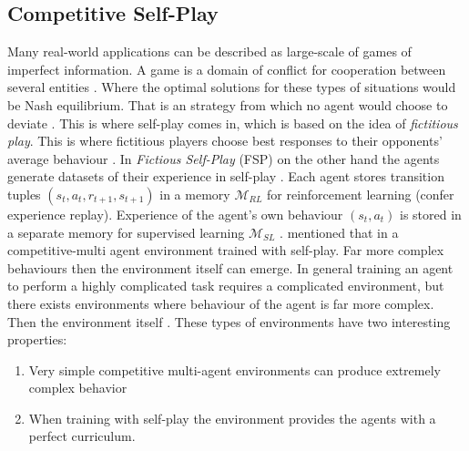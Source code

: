 \documentclass{kththesis}
\theoremstyle{definition}
\begin{document}
\subsection{Competitive Self-Play}
Many real-world applications can be described as large-scale of games of imperfect information. A game is a domain of conflict for cooperation between several entities \parencite{heinrich2016deep}. Where the optimal solutions for these types of situations would be Nash equilibrium. That is an strategy from which no agent would choose to deviate \parencite{heinrich2016deep}. This is where self-play comes in, which is based on the idea of \textit{fictitious play}. This is where fictitious players choose best responses to their opponents' average behaviour \parencite{heinrich2016deep}. In \textit{Fictious Self-Play} (FSP) on the other hand the agents generate datasets of their experience in self-play \parencite{heinrich2016deep}.  Each agent stores transition tuples $(s_t, a_t, r_{t+1}, s_{t+1})$ in a memory $\mathcal{M}_{RL}$ for reinforcement learning (confer experience replay). Experience of the agent's own behaviour $(s_t, a_t)$ is stored in a separate memory for supervised learning $\mathcal{M}_{SL}$ \parencite{heinrich2016deep}.
\newline
\newline
\textcite{bansal2017emergent} mentioned that in a competitive-multi agent environment trained with self-play. Far more complex behaviours then the environment itself can emerge. In general training an agent to perform a highly complicated task requires a complicated environment, but there exists environments where behaviour of the agent is far more complex. Then the environment itself \parencite{bansal2017emergent}. These types of environments have two interesting properties:

\begin{enumerate}
    \item Very simple competitive multi-agent environments can produce extremely complex behavior
    \item When training with self-play the environment provides the agents with  a perfect curriculum.
\end{enumerate}

\end{document}
